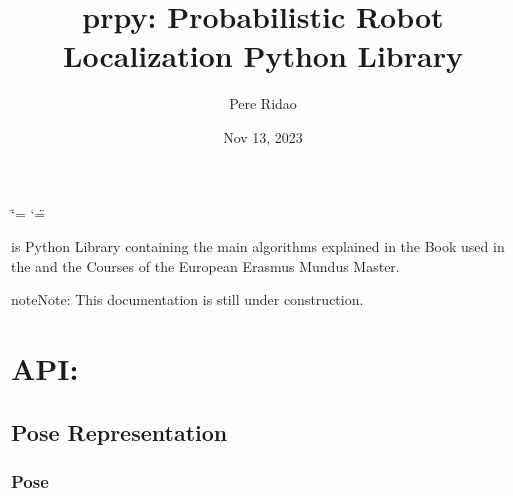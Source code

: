 \documentclass[letterpaper,10pt,english]{sphinxmanual}
\title{prpy: Probabilistic Robot Localization Python Library}
\date{Nov 13, 2023}
\author{Pere Ridao}
\begin{document}
\ifdefined\shorthandoff
  \ifnum\catcode`\=\string=\active\shorthandoff{=}\fi
  \ifnum\catcode`\"=\active{}\fi
\fi

\pagestyle{empty}
\sphinxmaketitle
\pagestyle{plain}
\sphinxtableofcontents
\pagestyle{normal}
\label{\detokenize{index::doc}}


\sphinxAtStartPar
{} is Python Library containing the main algorithms explained in the  Book used in the  and the  Courses of the  European Erasmus Mundus Master.

\begin{sphinxadmonition}{note}{Note:}
\sphinxAtStartPar
This documentation is still under construction.
\end{sphinxadmonition}


\chapter{API:}
\label{\detokenize{index:api}}
\sphinxstepscope


\section{Pose Representation}
\label{\detokenize{Pose:pose-representation}}\label{\detokenize{Pose::doc}}

\subsection{Pose}
\label{\detokenize{Pose:pose}}
\begin{figure}[htbp]
\centering

\noindent{}
\end{figure}
\end{document}

